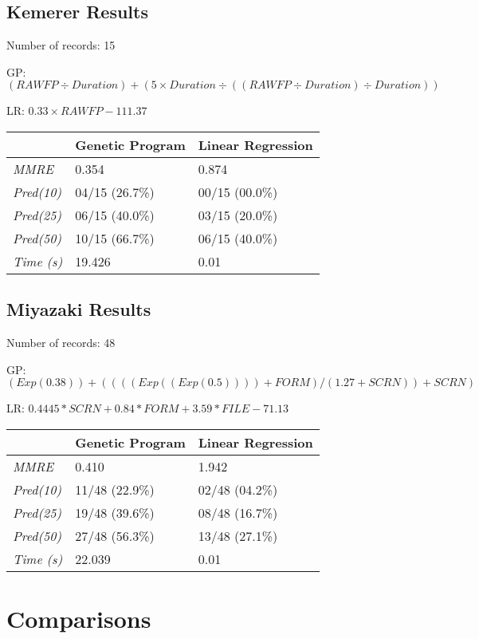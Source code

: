 \documentclass[11pt, a4paper]{article}
\begin{document}
\subsection{Kemerer Results} %
\label{sub:kemerer_results}
Number of records: 15

GP: \((RAWFP \div Duration) + (5 \times Duration \div ((RAWFP \div Duration)
\div Duration))\)

LR: \(0.33 \times RAWFP - 111.37\)

\begin{tabularx}{\textwidth}{| l | X | X |}
\hline
 & \textbf{Genetic Program} & \textbf{Linear Regression} \\
\hline
\emph{MMRE} & 0.354 & 0.874 \\
\hline
\emph{Pred(10)} & 04/15 (26.7\%) & 00/15 (00.0\%) \\
\emph{Pred(25)} & 06/15 (40.0\%) & 03/15 (20.0\%) \\
\emph{Pred(50)} & 10/15 (66.7\%) & 06/15 (40.0\%) \\
\hline
\emph{Time (s)} & 19.426 & 0.01 \\
\hline
\end{tabularx}

\subsection{Miyazaki Results} %
\label{sub:miyazaki_results}
Number of records: 48

GP: \((Exp(0.38)) + ((((Exp((Exp(0.5)))) + FORM) / (1.27 + SCRN)) + SCRN)\)

LR: \(0.4445 * SCRN + 0.84 * FORM + 3.59 * FILE - 71.13\)

\begin{tabularx}{\textwidth}{| l | X | X |}
\hline
 & \textbf{Genetic Program} & \textbf{Linear Regression} \\
\hline
\emph{MMRE} & 0.410 & 1.942 \\
\hline
\emph{Pred(10)} & 11/48 (22.9\%) & 02/48 (04.2\%) \\
\emph{Pred(25)} & 19/48 (39.6\%) & 08/48 (16.7\%) \\
\emph{Pred(50)} & 27/48 (56.3\%) & 13/48 (27.1\%) \\
\hline
\emph{Time (s)} & 22.039 & 0.01 \\
\hline
\end{tabularx}

\section{Comparisons} %
\label{sec:comparisons}
\end{document}
